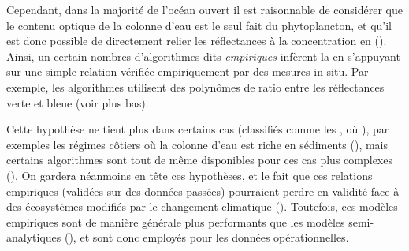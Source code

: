 Cependant, dans la majorité de l'océan ouvert il est raisonnable de considérer que le contenu optique de la colonne d'eau est le seul fait du phytoplancton\footnotemark, et qu'il est donc possible de directement relier les réflectances à la concentration en  (\cite{bailey_2006,brewin_2015a}).
Ainsi, un certain nombres d'algorithmes dits \emph{empiriques} infèrent la  en s'appuyant sur une simple relation vérifiée empiriquement par des mesures in situ.
Par exemple, les algorithmes  utilisent des polynômes de ratio entre les réflectances verte et bleue (voir plus bas).

Cette hypothèse ne tient plus dans certains cas (classifiés comme les , où ), par exemples les régimes côtiers où la colonne d'eau est riche en sédiments (\cite{bailey_2006,brewin_2015a}), mais certains algorithmes sont tout de même disponibles pour ces cas plus complexes (\cite{gohin_2002}).
On gardera néanmoins en tête ces hypothèses, et le fait que ces relations empiriques (validées sur des données passées) pourraient perdre en validité face à des écosystèmes modifiés par le changement climatique (\cite{dierssen_2010}).
Toutefois, ces modèles empiriques sont de manière générale plus performants que les modèles semi-analytiques (\cite{brewin_2015a}), et sont donc employés pour les données opérationnelles.


